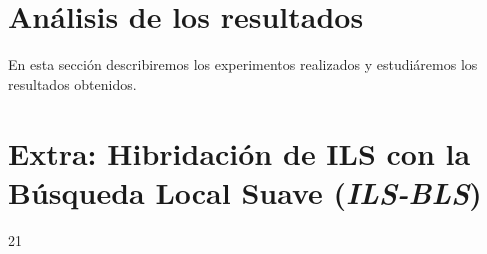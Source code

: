 \documentclass[11pt,a4paper]{article}
\begin{document}
\clearpage
\section{Análisis de los resultados}
En esta sección describiremos los experimentos realizados y estudiáremos los resultados obtenidos. 
\clearpage
\section{Extra:  Hibridación de ILS con la Búsqueda Local Suave (\textit{ILS-BLS})}

21

\end{document}
